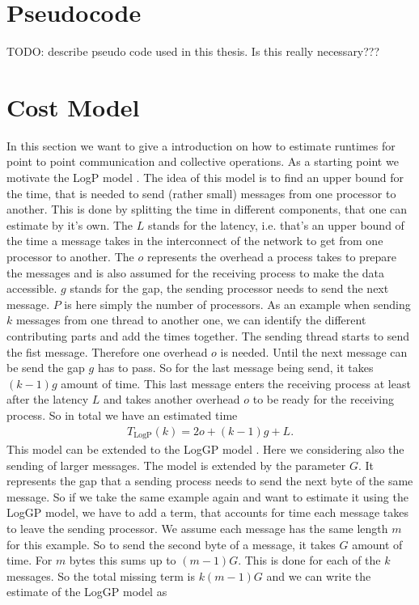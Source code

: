 \section{Pseudocode} \label{pseudocode}
TODO: describe pseudo code used in this thesis. Is this really necessary???

\section{Cost Model} \label{costModel}
In this section we want to give a introduction on how to estimate runtimes for point to point communication and collective operations. As a starting point we motivate the LogP model \cite{LogP}. The idea of this model is to find an upper bound for the time, that is needed to send (rather small) messages from one processor to another. This is done by splitting the time in different components, that one can estimate by it's own. The $L$ stands for the latency, i.e. that's an upper bound of the time a message takes in the interconnect of the network to get from one processor to another. The $o$ represents the overhead a process takes to prepare the messages and is also assumed for the receiving process to make the data accessible. $g$ stands for the gap, the sending processor needs to send the next message. $P$ is here simply the number of processors. As an example when sending $k$ messages from one thread to another one, we can identify the different contributing parts and add the times together. The sending thread starts to send the fist message. Therefore one overhead $o$ is needed. Until the next message can be send the gap $g$ has to pass. So for the last message being send, it takes $(k-1)g$  amount of time. This last message enters the receiving process at least after the latency $L$ and takes another overhead $o$ to be ready for the receiving process. So in total we have an estimated time
\begin{align*}
	T_\textrm{LogP}(k) = 2 o + (k-1)g + L.
\end{align*}
This model can be extended to the LogGP model \cite{LogGP}. Here we considering also the sending of larger messages. The model is extended by the parameter $G$. It represents the gap that a sending process needs to send the next byte of the same message. So if we take the same example again and want to estimate it using the LogGP model, we have to add a term, that accounts for time each message takes to leave the sending processor. We assume each message has the same length $m$ for this example. So to send the second byte of a message, it takes $G$ amount of time. For $m$ bytes this sums up to $(m-1)G$. This is done for each of the $k$ messages. So the total missing term is $k(m-1)G$ and we can write the estimate of the LogGP model as
